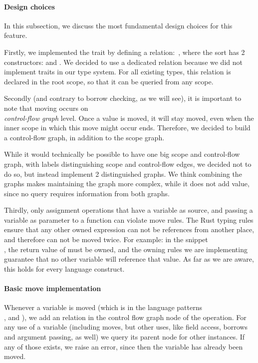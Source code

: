 \paragraph{Design choices}

In this subsection, we discuss the most fundamental design choices for this feature. 

Firstly, we implemented the  trait by defining a relation:\ , where the sort  has 2 constructors:  and . We decided to use a dedicated relation because we did not implement traits in our type system. For all existing types, this relation is declared in the root scope, so that it can be queried from any scope.

Secondly (and contrary to borrow checking, as we will see), it is important to note that moving occurs on\\ \textit{control-flow graph} level. Once a value is moved, it will stay moved, even when the inner scope in which this move might occur ends. Therefore, we decided to build a control-flow graph, in addition to the scope graph.

While it would technically be possible to have one big scope and control-flow graph, with labels distinguishing scope and control-flow edges, we decided not to do so, but instead implement 2 distinguished graphs. We think combining the graphs makes maintaining the graph more complex, while it does not add value, since no query requires information from both graphs.

Thirdly, only assignment operations that have a variable as source, and passing a variable as parameter to a function can violate move rules. The Rust typing rules ensure that any other owned expression can not be references from another place, and therefore can not be moved twice. For example: in the snippet\\ , the return value of  must be owned, and the owning rules we are implementing guarantee that no other variable will reference that value. As far as we are aware, this holds for every language construct. 

\paragraph{Basic move implementation}

Whenever a variable is moved (which is in the language patterns \\ ,  and ), we add an relation  in the control flow graph node of the operation. For any use of a variable (including moves, but other uses, like field access, borrows and argument passing, as well) we query its parent node for other  instances. If any of those exists, we raise an error, since then the variable has already been moved.

